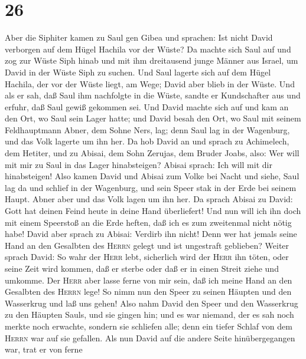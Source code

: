 \hypertarget{section-25}{%
\section{26}\label{section-25}}

 Aber die Siphiter kamen zu Saul gen Gibea und sprachen:
Ist nicht David verborgen auf dem Hügel Hachila vor der Wüste?
 Da machte sich Saul auf und zog zur Wüste Siph hinab und
mit ihm dreitausend junge Männer aus Israel, um David in der Wüste Siph
zu suchen.  Und Saul lagerte sich auf dem Hügel Hachila,
der vor der Wüste liegt, am Wege; David aber blieb in der Wüste.
 Und als er sah, daß Saul ihm nachfolgte in die Wüste,
sandte er Kundschafter aus und erfuhr, daß Saul gewiß gekommen sei.
 Und David machte sich auf und kam an den Ort, wo Saul
sein Lager hatte; und David besah den Ort, wo Saul mit seinem
Feldhauptmann Abner, dem Sohne Ners, lag; denn Saul lag in der
Wagenburg, und das Volk lagerte um ihn her.  Da hob David
an und sprach zu Achimelech, dem Hetiter, und zu Abisai, dem Sohn
Zerujas, dem Bruder Joabs, also: Wer will mit mir zu Saul in das Lager
hinabsteigen? Abisai sprach: Ich will mit dir hinabsteigen!
 Also kamen David und Abisai zum Volke bei Nacht und
siehe, Saul lag da und schlief in der Wagenburg, und sein Speer stak in
der Erde bei seinem Haupt. Abner aber und das Volk lagen um ihn her.
 Da sprach Abisai zu David: Gott hat deinen Feind heute in
deine Hand überliefert! Und nun will ich ihn doch mit einem Speerstoß an
die Erde heften, daß ich es zum zweitenmal nicht nötig habe!
 David aber sprach zu Abisai: Verdirb ihn nicht! Denn wer
hat jemals seine Hand an den Gesalbten des \textsc{Herrn} gelegt und ist
ungestraft geblieben?  Weiter sprach David: So wahr der
\textsc{Herr} lebt, sicherlich wird der \textsc{Herr} ihn töten, oder
seine Zeit wird kommen, daß er sterbe oder daß er in einen Streit ziehe
und umkomme.  Der \textsc{Herr} aber lasse ferne von mir
sein, daß ich meine Hand an den Gesalbten des \textsc{Herrn} lege! So
nimm nun den Speer zu seinen Häupten und den Wasserkrug und laß uns
gehen!  Also nahm David den Speer und den Wasserkrug zu
den Häupten Sauls, und sie gingen hin; und es war niemand, der es sah
noch merkte noch erwachte, sondern sie schliefen alle; denn ein tiefer
Schlaf von dem \textsc{Herrn} war auf sie gefallen.  Als
nun David auf die andere Seite hinübergegangen war, trat er von ferne
